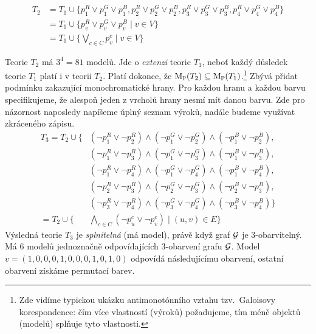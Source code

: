 \begin{align*}
T_2 &= T_1\cup \{p_1^R \lor p_1^G \lor p_1^B, p_2^R \lor p_2^G \lor p_2^B, p_3^R \lor p_3^G \lor p_3^B, p_4^R \lor p_4^G \lor p_4^B\} \\
    &= T_1\cup \{ p_v^R \lor p_v^G \lor p_v^B \mid v \in V \} \\
    &= T_1\cup \{\bigvee_{c\in C} p_v^c \mid v \in V \}  
\end{align*}

Teorie \( T_2 \) má \(3^4=81\) modelů. Jde o \emph{extenzi} teorie \( T_1 \), neboť každý důsledek teorie \( T_1 \) platí i v teorii \( T_2 \). Platí dokonce, že \( \operatorname{M}_\mathbb P(T_2)\subseteq\operatorname{M}_\mathbb P(T_1) \).\footnote{Zde vidíme typickou ukázku antimonotónního vztahu tzv.\ Galoisovy korespondence: čím více vlastností (výroků) požadujeme, tím méně objektů (modelů) splňuje tyto vlastnosti.} Zbývá přidat podmínku zakazující monochromatické hrany. Pro každou hranu a každou barvu specifikujeme, že alespoň jeden z vrcholů hrany nesmí mít danou barvu. Zde pro názornost naposledy napíšeme úplný seznam výroků, nadále budeme využívat zkráceného zápisu.
\begin{align*}
    T_3 = T_2\cup \{ & (\neg p_1^R \lor \neg p_2^R) \land (\neg p_1^G \lor \neg p_2^G) \land (\neg p_1^B \lor \neg p_2^B),\\
    & (\neg p_1^R \lor \neg p_3^R) \land (\neg p_1^G \lor \neg p_3^G) \land (\neg p_1^B \lor \neg p_3^B),\\
    & (\neg p_1^R \lor \neg p_4^R) \land (\neg p_1^G \lor \neg p_4^G) \land (\neg p_1^B \lor \neg p_4^B),\\
    & (\neg p_2^R \lor \neg p_3^R) \land (\neg p_2^G \lor \neg p_3^G) \land (\neg p_2^B \lor \neg p_3^B),\\
    & (\neg p_3^R \lor \neg p_4^R) \land (\neg p_3^G \lor \neg p_4^G) \land (\neg p_3^B \lor \neg p_4^B)\} \\  
= T_2\cup \{ &\bigwedge_{c\in C} 
(\neg p_u^c \lor \neg p_v^c) \mid (u,v) \in E \}
\end{align*}
Výsledná teorie \( T_3 \) je \emph{splnitelná} (má model), právě když graf \( \mathcal{G} \) je 3-obarvitelný. Má 6 modelů jednoznačně odpovídajících 3-obarvení grafu \( \mathcal{G} \). Model \( v = (1,0,0,0,1,0,0,0,1,0,1,0) \) odpovídá následujícímu obarvení, ostatní obarvení získáme permutací barev.
\begin{center}
\end{center}

